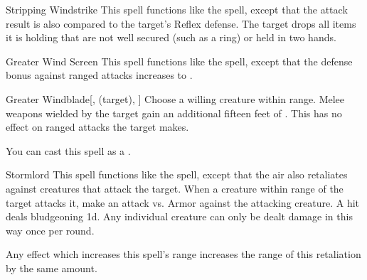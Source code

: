 \lowercase{\hypertarget{spell:Stripping Windstrike}{}}\label{spell:Stripping Windstrike}
\begin{ability}[\nth{2}]{\hypertarget{spell:Stripping Windstrike}{Stripping Windstrike}}
This spell functions like the  spell, except that the attack result is also compared to the target's Reflex defense.
\hit The target drops all items it is holding that are not well secured (such as a ring) or held in two hands.
\end{ability}
\vspace{0.25em}



\lowercase{\hypertarget{spell:Greater Wind Screen}{}}\label{spell:Greater Wind Screen}
\begin{ability}[\nth{3}]{\hypertarget{spell:Greater Wind Screen}{Greater Wind Screen}}
This spell functions like the  spell, except that the defense bonus against ranged attacks increases to .
\end{ability}
\vspace{0.25em}



\lowercase{\hypertarget{spell:Greater Windblade}{}}\label{spell:Greater Windblade}
\begin{ability}[\nth{3}]{\hypertarget{spell:Greater Windblade}{Greater Windblade}}[,  (target), ]
Choose a willing creature within \rngclose range.
Melee weapons wielded by the target gain an additional fifteen feet of .
This has no effect on ranged attacks the target makes.

You can cast this spell as a .
\end{ability}
\vspace{0.25em}



\lowercase{\hypertarget{spell:Stormlord}{}}\label{spell:Stormlord}
\begin{ability}[\nth{3}]{\hypertarget{spell:Stormlord}{Stormlord}}
This spell functions like the  spell, except that the air also retaliates against creatures that attack the target.
When a creature within \rngclose range of the target attacks it, make an attack vs. Armor against the attacking creature.
A hit deals bludgeoning  \minus1d.
Any individual creature can only be dealt damage in this way once per round.

Any effect which increases this spell's range increases the range of this retaliation by the same amount.
\end{ability}
\vspace{0.25em}



